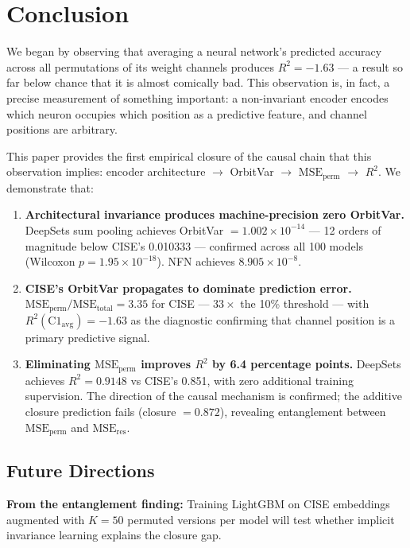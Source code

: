 \section{Conclusion}
\label{sec:conclusion}

We began by observing that averaging a neural network's predicted accuracy across all permutations of its weight channels produces $R^2 = -1.63$ --- a result so far below chance that it is almost comically bad. This observation is, in fact, a precise measurement of something important: a non-invariant encoder encodes which neuron occupies which position as a predictive feature, and channel positions are arbitrary.

This paper provides the first empirical closure of the causal chain that this observation implies: encoder architecture $\to$ OrbitVar $\to$ $\text{MSE}_\text{perm}$ $\to$ $R^2$. We demonstrate that:

\begin{enumerate}
\item \textbf{Architectural invariance produces machine-precision zero OrbitVar.} DeepSets sum pooling achieves OrbitVar $= 1.002 \times 10^{-14}$ --- 12 orders of magnitude below CISE's 0.010333 --- confirmed across all 100 models (Wilcoxon $p = 1.95 \times 10^{-18}$). NFN achieves $8.905 \times 10^{-8}$.

\item \textbf{CISE's OrbitVar propagates to dominate prediction error.} $\text{MSE}_\text{perm}/\text{MSE}_\text{total} = 3.35$ for CISE --- $33\times$ the 10\% threshold --- with $R^2(\text{C1}_\text{avg}) = -1.63$ as the diagnostic confirming that channel position is a primary predictive signal.

\item \textbf{Eliminating $\text{MSE}_\text{perm}$ improves $R^2$ by 6.4 percentage points.} DeepSets achieves $R^2 = 0.9148$ vs CISE's 0.851, with zero additional training supervision. The direction of the causal mechanism is confirmed; the additive closure prediction fails (closure $= 0.872$), revealing entanglement between $\text{MSE}_\text{perm}$ and $\text{MSE}_\text{res}$.
\end{enumerate}

\subsection*{Future Directions}

\textbf{From the entanglement finding:} Training LightGBM on CISE embeddings augmented with $K=50$ permuted versions per model will test whether implicit invariance learning explains the closure gap.


